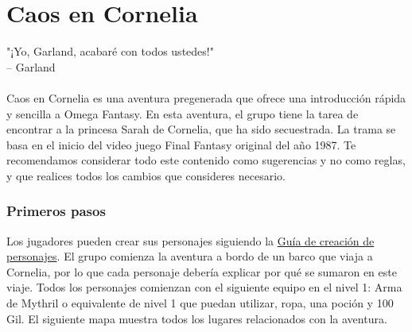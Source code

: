 \section*{\hypertarget{coc}{Caos en Cornelia}}
%
"¡Yo, Garland, acabaré con todos ustedes!" \\ 
\indent -- Garland \\\\ 
Caos en Cornelia es una aventura pregenerada que ofrece una introducción rápida y sencilla a Omega Fantasy. En esta aventura, el grupo tiene la tarea de encontrar a la princesa Sarah de Cornelia, que ha sido secuestrada. La trama se basa en el inicio del video juego Final Fantasy original del año 1987. Te recomendamos considerar todo este contenido como sugerencias y no como reglas, y que realices todos los cambios que consideres necesario. 

\subsubsection*{Primeros pasos}
Los jugadores pueden crear sus personajes siguiendo la \hyperlink{char}{Guía de creación de personajes}. El grupo comienza la aventura a bordo de un barco que viaja a Cornelia, por lo que cada personaje debería explicar por qué se sumaron en este viaje. Todos los personajes comienzan con el siguiente equipo en el nivel 1: Arma de Mythril o equivalente de nivel 1 que puedan utilizar, ropa, una poción y 100 Gil. El siguiente mapa muestra todos los lugares relacionados con la aventura.

\vfill

